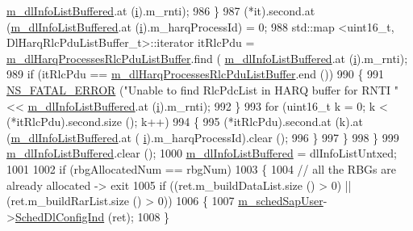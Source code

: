 \begin{DoxyCode}
      \hyperlink{classns3_1_1TtaFfMacScheduler_af7afa3d5a610456175b21bad17cc04ae}{m\_dlInfoListBuffered}.at (\hyperlink{bernuolliDistribution_8m_a6f6ccfcf58b31cb6412107d9d5281426}{i}).m\_rnti);
986             \}
987           (*it).second.at (\hyperlink{classns3_1_1TtaFfMacScheduler_af7afa3d5a610456175b21bad17cc04ae}{m\_dlInfoListBuffered}.at (\hyperlink{bernuolliDistribution_8m_a6f6ccfcf58b31cb6412107d9d5281426}{i}).m\_harqProcessId) = 0;
988           std::map <uint16\_t, DlHarqRlcPduListBuffer\_t>::iterator itRlcPdu =  
      \hyperlink{classns3_1_1TtaFfMacScheduler_a04e2e36b8114bfe977b8a3443822d7f1}{m\_dlHarqProcessesRlcPduListBuffer}.find (
      \hyperlink{classns3_1_1TtaFfMacScheduler_af7afa3d5a610456175b21bad17cc04ae}{m\_dlInfoListBuffered}.at (\hyperlink{bernuolliDistribution_8m_a6f6ccfcf58b31cb6412107d9d5281426}{i}).m\_rnti);
989           \textcolor{keywordflow}{if} (itRlcPdu == \hyperlink{classns3_1_1TtaFfMacScheduler_a04e2e36b8114bfe977b8a3443822d7f1}{m\_dlHarqProcessesRlcPduListBuffer}.end ())
990             \{
991               \hyperlink{group__fatal_ga5131d5e3f75d7d4cbfd706ac456fdc85}{NS\_FATAL\_ERROR} (\textcolor{stringliteral}{"Unable to find RlcPdcList in HARQ buffer for RNTI "} << 
      \hyperlink{classns3_1_1TtaFfMacScheduler_af7afa3d5a610456175b21bad17cc04ae}{m\_dlInfoListBuffered}.at (\hyperlink{bernuolliDistribution_8m_a6f6ccfcf58b31cb6412107d9d5281426}{i}).m\_rnti);
992             \}
993           \textcolor{keywordflow}{for} (uint16\_t k = 0; k < (*itRlcPdu).second.size (); k++)
994             \{
995               (*itRlcPdu).second.at (k).at (\hyperlink{classns3_1_1TtaFfMacScheduler_af7afa3d5a610456175b21bad17cc04ae}{m\_dlInfoListBuffered}.at (
      \hyperlink{bernuolliDistribution_8m_a6f6ccfcf58b31cb6412107d9d5281426}{i}).m\_harqProcessId).clear ();
996             \}
997         \}
998     \}
999   \hyperlink{classns3_1_1TtaFfMacScheduler_af7afa3d5a610456175b21bad17cc04ae}{m\_dlInfoListBuffered}.clear ();
1000   \hyperlink{classns3_1_1TtaFfMacScheduler_af7afa3d5a610456175b21bad17cc04ae}{m\_dlInfoListBuffered} = dlInfoListUntxed;
1001 
1002   \textcolor{keywordflow}{if} (rbgAllocatedNum == rbgNum)
1003     \{
1004       \textcolor{comment}{// all the RBGs are already allocated -> exit}
1005       \textcolor{keywordflow}{if} ((ret.m\_buildDataList.size () > 0) || (ret.m\_buildRarList.size () > 0))
1006         \{
1007           \hyperlink{classns3_1_1TtaFfMacScheduler_a950cb3e5f468debf1fa002171ff299f1}{m\_schedSapUser}->\hyperlink{classns3_1_1FfMacSchedSapUser_a28f8484af5a32a45ee6c0e51770d83f7}{SchedDlConfigInd} (ret);
1008         \}

\end{DoxyCode}
